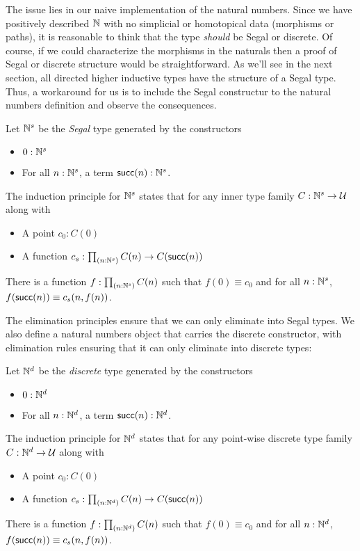 \documentclass[main.tex]{subfiles}
\begin{document}
The issue lies in our naive implementation of the natural numbers. Since we have positively described $\mathbb{N}$ with no simplicial or homotopical data (morphisms or paths), it is reasonable to think that the type \textit{should} be Segal or discrete. Of course, if we could characterize the morphisms in the naturals then a proof of Segal or discrete structure would be straightforward. As we'll see in the next section, all directed higher inductive types have the structure of a Segal type. Thus, a workaround for us is to include the Segal constructur to the natural numbers definition and observe the consequences.

\begin{definition}
    \noindent Let $\mathbb{N}^s$ be the \textit{Segal} type generated by the constructors
    \begin{itemize}
       \item $0 : \mathbb{N}^s$
       \item For all $n : \mathbb{N}^s$, a term $\mathsf{succ}(n) : \mathbb{N}^s$.
    \end{itemize}
    The induction principle for $\mathbb{N}^s$ states that for any inner type family $C : \mathbb{N}^s \to \mathcal{U}$ along with
    \begin{itemize}
       \item A point $c_0 : C(0)$
       \item A function $c_s : \prd{n:\Ns}C(n) \to C(\su(n))$
    \end{itemize}
    There is a function $f : \prd{n:\Ns}C(n)$ such that $f(0) \equiv c_0$ and for all $n : \mathbb{N}^s$, $f(\mathsf{succ}(n)) \equiv c_s(n, f(n))$.    
\end{definition}
The elimination principles ensure that we can only eliminate into Segal types. We also define a natural numbers object that carries the discrete constructor, with elimination rules ensuring that it can only eliminate into discrete types:

\begin{definition}
    \noindent Let $\mathbb{N}^d$ be the \textit{discrete} type generated by the constructors
\begin{itemize}
   \item $0 : \mathbb{N}^d$
   \item For all $n : \mathbb{N}^d$, a term $\mathsf{succ}(n) : \mathbb{N}^d$.
\end{itemize}
The induction principle for $\mathbb{N}^d$ states that for any point-wise discrete type family $C : \mathbb{N}^d \to \mathcal{U}$ along with
\begin{itemize}
   \item A point $c_0 : C(0)$
   \item A function $c_s : \prd{n:\Nd}C(n) \to C(\su(n))$
\end{itemize}
There is a function $f : \prd{n:\Nd}C(n)$ such that $f(0) \equiv c_0$ and for all $n : \mathbb{N}^d$, $f(\mathsf{succ}(n)) \equiv c_s(n, f(n))$.
\end{definition}
\end{document}
